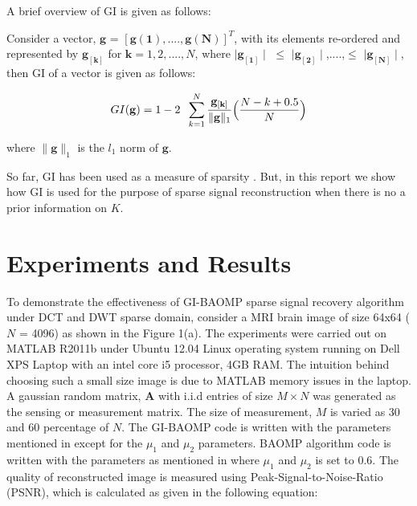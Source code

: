 \documentclass[11pt,conference]{IEEEtran}
\begin{document}
\par A brief overview of GI is given as follows:

\par Consider a vector, $\mathbf{g}$ = $[\mathbf{g(1),....,g(N)}]^T$, with its elements re-ordered and represented by $\mathbf{g_{[k]}}$
for $\mathbf{k} = 1,2,....,N$, where $\mid\mathbf{g_{[1]}}\mid$ $\leq$ $\mid\mathbf{g_{[2]}}\mid$,....,$\leq$ $\mid\mathbf{g_{[N]}}\mid$, then GI of a vector is given as follows:

\begin{equation}
\label{Eqn:GI}
GI(\mathbf{g}) = 1 - 2 \hspace{0.2cm}\sum^N_{k=1} \frac{\mathbf{g_{[k]}}}{\|\mathbf{g}\|_1} \Big(\frac{N - k + 0.5}{N}\Big)
\end{equation}

where $\|\mathbf{g}\|_1$ is the $l_1$ norm of $\mathbf{g}$.

\par So far, GI has been used as a measure of sparsity \cite{sparsemeasure}. But, in this report we show how GI is used for the purpose of sparse signal reconstruction when there is no a prior information on $K$.

\section{Experiments and Results}
\label{sec:exp}
To demonstrate the effectiveness of GI-BAOMP sparse signal recovery algorithm under DCT and DWT sparse domain, consider a MRI brain image of size 64x64 ($N$ = 4096) as shown in the Figure 1(a). The experiments were carried out on MATLAB R2011b under Ubuntu 12.04 Linux operating system running on Dell XPS Laptop with an intel core i5 processor, 4GB RAM. The intuition behind choosing such a small size image is due to MATLAB memory issues in the laptop. A gaussian random matrix, $\mathbf{A}$ with i.i.d entries of size $M \times N$ was generated as the sensing or measurement matrix. The size of measurement, $M$ is varied as 30 and 60 percentage of $N$. The GI-BAOMP code is written with the parameters mentioned in \cite{baomp} except for the $\mu_1$ and $\mu_2$ parameters. BAOMP algorithm code is written with the parameters as mentioned in \cite{baomp} where $\mu_1$ and $\mu_2$ is set to 0.6. The quality of reconstructed image is measured using Peak-Signal-to-Noise-Ratio (PSNR), which is calculated as given in 
the following equation:
\end{document}
